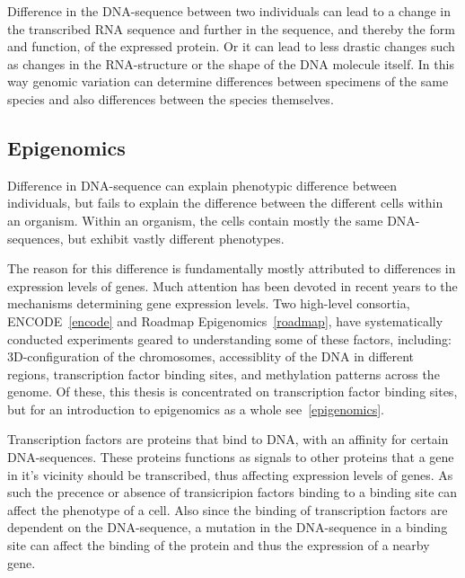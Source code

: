 Difference in the DNA-sequence between two individuals can lead to a change in the transcribed RNA sequence and further in the sequence, and thereby the form and function, of the expressed protein.
Or it can lead to less drastic changes such as changes in the RNA-structure or the shape of the DNA molecule itself.
In this way genomic variation can determine differences between specimens of the same species and also differences between the species themselves.

\subsection{Epigenomics}
Difference in DNA-sequence can explain phenotypic  difference between individuals, but fails to explain the difference between the different cells within an organism.
Within an organism, the cells contain mostly the same DNA-sequences, but exhibit vastly different phenotypes. 

The reason for this difference is fundamentally mostly attributed to differences in expression levels of genes.
Much attention has been devoted in recent years to the mechanisms determining gene expression levels.
Two high-level consortia, ENCODE~\ref{encode} and Roadmap Epigenomics~\ref{roadmap}, have systematically conducted experiments geared to understanding some of these factors, including: 3D-configuration of the chromosomes, accessiblity of the DNA in different regions, transcription factor binding sites, and methylation patterns across the genome. Of these, this thesis is concentrated on transcription factor binding sites, but for an introduction to epigenomics as a whole see~\ref{epigenomics}.

Transcription factors are proteins that bind to DNA, with an affinity for certain DNA-sequences.
These proteins functions as signals to other proteins that a gene in it's vicinity should be transcribed, thus affecting expression levels of genes.
As such the precence or absence of transicripion factors binding to a binding site can affect the phenotype of a cell.
Also since the binding of transcription factors are dependent on the DNA-sequence, a mutation in the DNA-sequence in a binding site can affect the binding of the protein and thus the expression of a nearby gene. 

